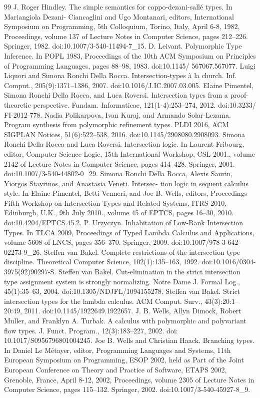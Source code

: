 \begin{thebibliography}{99}
 J. Roger Hindley. The simple semantics for coppo-dezani-sallé types. In Mariangiola Dezani- Ciancaglini and Ugo Montanari, editors, International Symposium on Programming, 5th Colloquium, Torino, Italy, April 6-8, 1982, Proceedings, volume 137 of Lecture Notes in Computer Science, pages 212–226. Springer, 1982. doi:10.1007/3-540-11494-7\_15.
 D. Leivant. Polymorphic Type Inference. In POPL 1983, Proceedings of the 10th ACM Symposium on Principles of Programming Languages, pages 88–98, 1983. doi:10.1145/ 567067.567077.
 Luigi Liquori and Simona Ronchi Della Rocca. Intersection-types à la church. Inf. Comput., 205(9):1371–1386, 2007. doi:10.1016/J.IC.2007.03.005.
 Elaine Pimentel, Simona Ronchi Della Rocca, and Luca Roversi. Intersection types from a proof-theoretic perspective. Fundam. Informaticae, 121(1-4):253–274, 2012. doi:10.3233/ FI-2012-778.
 Nadia Polikarpova, Ivan Kuraj, and Armando Solar-Lezama. Program synthesis from polymorphic refinement types. PLDI 2016, ACM SIGPLAN Notices, 51(6):522–538, 2016. doi:10.1145/2908080.2908093.
 Simona Ronchi Della Rocca and Luca Roversi. Intersection logic. In Laurent Fribourg, editor, Computer Science Logic, 15th International Workshop, CSL 2001., volume 2142 of Lecture Notes in Computer Science, pages 414–428. Springer, 2001. doi:10.1007/3-540-44802-0\_29.
 Simona Ronchi Della Rocca, Alexis Saurin, Yiorgos Stavrinos, and Anastasia Veneti. Intersec- tion logic in sequent calculus style. In Elaine Pimentel, Betti Venneri, and Joe B. Wells, editors, Proceedings Fifth Workshop on Intersection Types and Related Systems, ITRS 2010, Edinburgh, U.K., 9th July 2010., volume 45 of EPTCS, pages 16–30, 2010. doi:10.4204/EPTCS.45.2.
 P. Urzyczyn. Inhabitation of Low-Rank Intersection Types. In TLCA 2009, Proceedings of Typed Lambda Calculus and Applications, volume 5608 of LNCS, pages 356–370. Springer, 2009. doi:10.1007/978-3-642-02273-9\_26.
 Steffen van Bakel. Complete restrictions of the intersection type discipline. Theoretical Computer Science, 102(1):135–163, 1992. doi:10.1016/0304-3975(92)90297-S.
 Steffen van Bakel. Cut-elimination in the strict intersection type assignment system is strongly normalizing. Notre Dame J. Formal Log., 45(1):35–63, 2004. doi:10.1305/NDJFL/1094155278.
 Steffen van Bakel. Strict intersection types for the lambda calculus. ACM Comput. Surv., 43(3):20:1–20:49, 2011. doi:10.1145/1922649.1922657.
 J. B. Wells, Allyn Dimock, Robert Muller, and Franklyn A. Turbak. A calculus with polymorphic and polyvariant flow types. J. Funct. Program., 12(3):183–227, 2002. doi: 10.1017/S0956796801004245.
 Joe B. Wells and Christian Haack. Branching types. In Daniel Le Métayer, editor, Programming Languages and Systems, 11th European Symposium on Programming, ESOP 2002, held as Part of the Joint European Conference on Theory and Practice of Software, ETAPS 2002, Grenoble, France, April 8-12, 2002, Proceedings, volume 2305 of Lecture Notes in Computer Science, pages 115–132. Springer, 2002. doi:10.1007/3-540-45927-8\_9.
\end{thebibliography}
